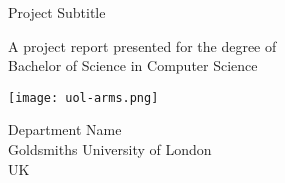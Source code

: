 \makeatletter
\begin{titlepage}
   \begin{center}
       \vspace*{1cm}

       \Huge
       \textbf{\@title}

       \vspace{0.5cm}
       \Large
       Project Subtitle
            
       \vspace{1.5cm}

       \textbf{\@author}

       \vfill
            
       A project report presented for the degree of\\
       Bachelor of Science in Computer Science
            
       \vspace{0.8cm}
     
       \texttt{[image: uol-arms.png]}
            
       \Large
       Department Name\\
       Goldsmiths University of London\\
       UK\\
       \@date
       
   \end{center}
\end{titlepage}
\makeatother
